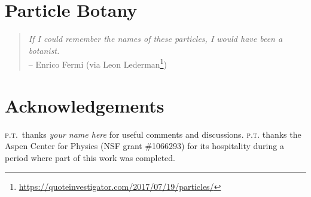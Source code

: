\documentclass[12pt]{article}
\numberwithin{equation}{section}    %
\begin{document}
\section{Particle Botany}

\begin{quote}
\emph{If I could remember the names of these particles, I would have been a botanist.}\\
	-- Enrico Fermi	(via Leon Lederman\footnote{\url{https://quoteinvestigator.com/2017/07/19/particles/}})
\end{quote}



\section*{Acknowledgements}


%
\textsc{p.t.}\ thanks 
\emph{your name here}
for useful comments and discussions. 
%
\textsc{p.t.} thanks the Aspen Center for Physics (NSF grant \#1066293) for its hospitality during a period where part of this work was completed.



% 
\end{document}
